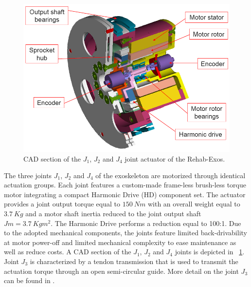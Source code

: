 \documentclass[journal]{IEEEtran}
\begin{document}
\begin{figure}[]
	\centering
	\includegraphics[width=0.7\columnwidth]{JointActuator}
	\caption{CAD section of the $J_1$, $J_2$ and $J_4$ joint actuator of the Rehab-Exos.}
	\label{fig:exosActuatorCAD}
\end{figure}
%
\par The three joints $J_1$, $J_2$ and $J_4$ of the exoskeleton are motorized through identical actuation groups. Each joint features a custom-made frame-less brush-less torque motor integrating a compact Harmonic Drive (HD) component set. The actuator provides a joint output torque equal to $150\ Nm$ with an overall weight equal to $3.7\ Kg$ and a motor shaft inertia reduced to the joint output shaft $Jm = 3.7\ Kgm^2$. The Harmonic Drive performs a reduction equal to 100:1. Due to the adopted mechanical components, the joints feature limited back-drivability at motor power-off and limited mechanical complexity to ease maintenance as well as reduce costs. A CAD section of the $J_1$, $J_2$ and $J_4$ joints is depicted in \figurename \ \ref{fig:exosActuatorCAD}.
Joint $J_3$ is characterized by a tendon transmission that is used to transmit the actuation torque through an open semi-circular guide. More detail on the joint $J_3$ can be found in \cite{vertechy2009development}.
\end{document}
